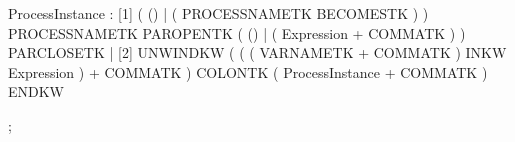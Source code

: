 %
%
%
\begin{rail}
ProcessInstance : [1] ( () | ( PROCESSNAMETK BECOMESTK ) )
                      PROCESSNAMETK PAROPENTK ( () | ( Expression + COMMATK ) ) PARCLOSETK
                | [2] UNWINDKW ( ( ( VARNAMETK + COMMATK ) INKW Expression ) + COMMATK )
                      COLONTK ( ProcessInstance + COMMATK ) ENDKW

                ;
\end{rail}
